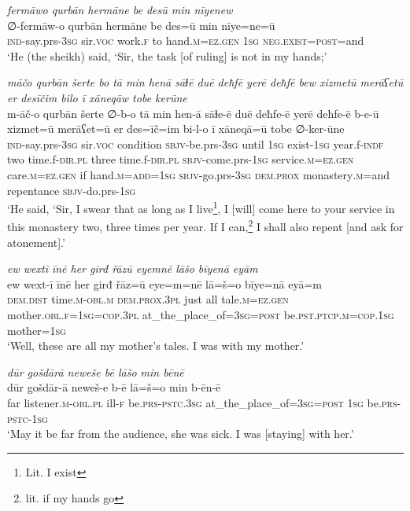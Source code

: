 \ea \label{ŠJ.86}
\textit{fermāwo qurbān hermāne be desū min nīyenew} \\ 
\gll ∅-fermāw-o qurbān hermāne be des=ū min nīye=ne=ū \\ 
 \textsc{ind-}say.prs\textsc{-3sg} sir.\textsc{voc} work\textsc{.f} to hand\textsc{.m}\textsc{=ez.gen} \textsc{1sg} \textsc{\textsc{neg.}exist}\textsc{=\textsc{post}}=and \\ 
\glt `He (the sheikh) said, ‘Sir, the task [of ruling] is not in my hands;'
\z 
 
\ea \label{ŠJ.98}
\textit{māčo qurbān šerte bo tā min henā sāɫē duē deħfē yerē deħfē bew xizmetū merāʕetū er desīčim bilo ī xāneqāw tobe kerūne} \\ 
\gll m-āč-o qurbān šerte ∅-b-o tā min hen-ā sāɫe-ē duē deħfe-ē yerē deħfe-ē b-e-ū xizmet=ū merāʕet=ū er des=īč=im bi-l-o ī xāneqā=ū tobe ∅-ker-ūne \\ 
 \textsc{ind-}say.prs\textsc{-3sg} sir.\textsc{voc} condition \textsc{sbjv-}be.prs\textsc{-3sg} until \textsc{1sg} exist\textsc{-\textsc{1sg}} year.f\textsc{-indf} two time.f\textsc{-dir}\textsc{.pl} three time.f\textsc{-dir}\textsc{.pl} \textsc{sbjv-}come.prs\textsc{-\textsc{1sg}} service\textsc{.m}\textsc{=ez.gen} care\textsc{.m}\textsc{=ez.gen} if hand\textsc{.m}\textsc{=add}\textsc{=\textsc{1sg}} \textsc{sbjv-}go.prs\textsc{-3sg} \textsc{dem.prox} monastery\textsc{.m}=and repentance \textsc{sbjv-}do.prs\textsc{-\textsc{1sg}} \\ 
\glt `He said, ‘Sir, I swear that as long as I live\footnote{Lit. I exist}, I [will] come here to your service in this monastery two, three times per year. If I can,\footnote{lit. if my hands go} I shall also repent [and ask for atonement].'
\z 
 
\ea \label{KŠ.1}
\textit{ew wextī īnē her girđ řāzū eyemnē lāšo bīyenā eyām} \\ 
\gll ew wext-ī īnē her girđ řāz=ū eye=m=nē lā=š=o bīye=nā eyā=m \\ 
 \textsc{dem.dist} time\textsc{.m}\textsc{-obl}\textsc{.m} \textsc{dem.prox}\textsc{.3pl} just all tale\textsc{.m}\textsc{=ez.gen} mother\textsc{.obl}\textsc{.f}\textsc{=\textsc{1sg}}\textsc{=cop}\textsc{.3pl} at\_the\_place\_of\textsc{=3sg}\textsc{=\textsc{post}} be\textsc{.pst}\textsc{.ptcp}\textsc{.m}\textsc{=cop}\textsc{.\textsc{1sg}} mother\textsc{=\textsc{1sg}} \\ 
\glt `Well, these are all my mother’s tales. I was with my mother.'
\z 
 
\ea \label{KŠ.2}
\textit{dūr gošdārā neweše bē lāšo min bēnē} \\ 
\gll dūr gošdār-ā neweš-e b-ē lā=š=o min b-ēn-ē \\ 
 far listener\textsc{.m}\textsc{-obl}\textsc{.pl} ill\textsc{-f} be\textsc{.prs}\textsc{-pstc}\textsc{.3sg} at\_the\_place\_of\textsc{=3sg}\textsc{=\textsc{post}} \textsc{1sg} be\textsc{.prs}\textsc{-pstc}\textsc{-\textsc{1sg}} \\ 
\glt `May it be far from the audience, she was sick. I was [staying] with her.'
\z 
 
